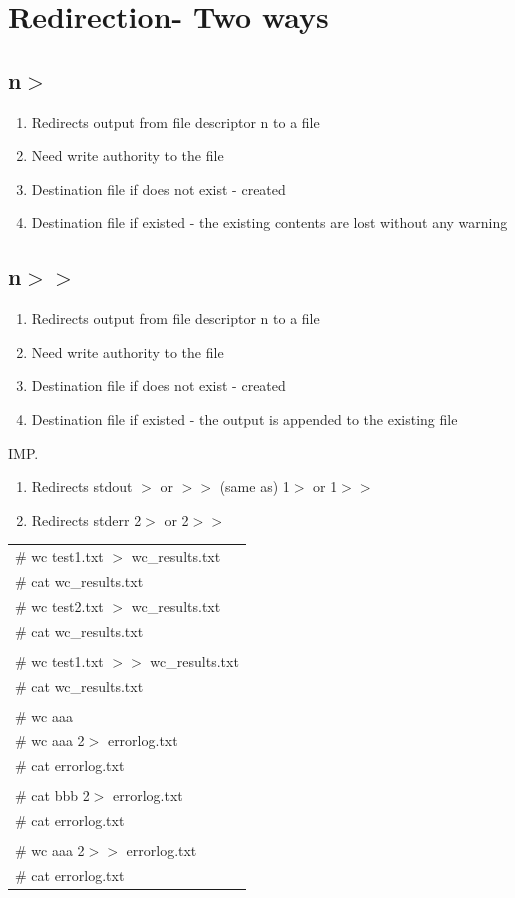 \documentclass[12pt, a4paper]{report}
\begin{document}
\section{Redirection- Two ways}
\subsection{n$>$}
\begin{enumerate}
\item Redirects output from file descriptor n to a file
\item Need write authority to the file
\item Destination file if does not exist - created
\item Destination file if existed - the existing contents are lost without any warning
\end{enumerate}
\subsection{n$>>$}
\begin{enumerate}
\item Redirects output from file descriptor n to a file
\item Need write authority to the file
\item Destination file if does not exist - created
\item Destination file if existed - the output is appended to the existing file
\end{enumerate}
IMP.
\begin{enumerate}
\item Redirects stdout $>$ or $>>$ (same as) 1$>$ or 1$>>$
\item Redirects stderr 2$>$ or 2$>>$
\end{enumerate}
\begin{tabular}{|l|}\hline
\# wc test1.txt $>$ wc\_results.txt\\
\# cat wc\_results.txt\\
\# wc test2.txt $>$ wc\_results.txt\\
\# cat wc\_results.txt\\
\\		
\# wc test1.txt $>>$ wc\_results.txt\\
\# cat wc\_results.txt\\
\\
\# wc aaa\\
\# wc aaa 2$>$ errorlog.txt\\
\# cat errorlog.txt\\
\\		
\# cat bbb 2$>$ errorlog.txt\\
\# cat errorlog.txt\\
\\		
\# wc aaa 2$>>$ errorlog.txt\\
\# cat errorlog.txt\\ \hline
\end{tabular}
\end{document}

